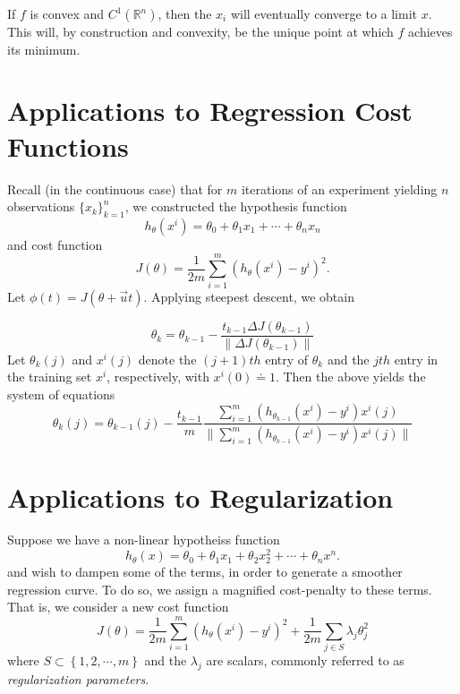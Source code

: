 \documentclass[12pt]{amsbook}
\newcommand{\rr}{\mathbb{R}}
\theoremstyle{plain}
\theoremstyle{definition}
\theoremstyle{remark}
\numberwithin{equation}{section}  %
\numberwithin{equation}{section}  %
\begin{document}
If $f$ is convex and $C^{1}(\rr^{n})$, then the $x_{i}$ will eventually converge
to a limit $x$. This will, by construction and convexity, be the unique point at
which $f$ achieves its minimum.

\section{Applications to Regression Cost Functions}

Recall (in the continuous case) that for $m$ iterations of an experiment
yielding $n$ observations $\{x_{k} \}_{k=1}^{n}$, we constructed the hypothesis function
\begin{equation*}
	h_{\theta}(x^{i}) = \theta_{0} + \theta_{1}x_{1} + \cdots +
	\theta_{n} x_{n}
\end{equation*}
and cost function
\begin{equation*}
	J(\theta) = \frac{1}{2m} \sum_{i=1}^{m} \left (h_{\theta}(x^{i}) - y^{i}
	\right )^{2}.
\end{equation*}
Let $\phi(t) = J(\theta + \vec{u} t)$. Applying steepest descent, we obtain 

\begin{equation*}
	\theta_{k} = \theta_{k-1} - \frac{t_{k-1} \Delta J(\theta_{k-1})}{ \| \Delta
		J(\theta_{k-1}) \|}
\end{equation*}
Let $\theta_{k}(j)$ and $x^{i}(j)$ denote the $(j+1)th$ entry of $\theta_{k}$
and the $jth$ entry in the training set $x^{i}$, respectively, with
$x^{i}(0) \doteq 1$. Then the above yields the system of equations
\begin{equation*}
	\theta_{k}(j) = \theta_{k-1}(j) - \frac{t_{k-1}}{m} \frac{\sum_{i=1}^{m}
	\left( h_{\theta_{k-1}}(x^{i}) - y^{i} \right) x^{i}(j)}{ 
	\|  \sum_{i=1}^{m}
	\left( h_{\theta_{k-1}}(x^{i}) - y^{i} \right) x^{i}(j) \|}
\end{equation*}

\section{Applications to Regularization}
Suppose we have a non-linear hypotheiss function
\begin{equation*}
	h_{\theta}(x) = \theta_{0} + \theta_{1} x_{1} + \theta_{2} x_{2}^{2} + \cdots
	+ \theta_{n} x^{n}.
\end{equation*}
and wish to dampen some of the terms, in order to generate a smoother regression
curve. To do so, we assign a magnified cost-penalty to these terms. That is, we
consider a new cost function
\begin{equation*}
	J(\theta) = \frac{1}{2m} \sum_{i=1}^{m} \left( h_{\theta}(x^{i}) -
	y^{i} \right)^{2} + \frac{1}{2m} \sum_{j \in S} \lambda_{j}
	\theta_{j}^{2}
\end{equation*}
where $S \subset \left\{ 1, 2, \cdots, m \right\}$ and the $\lambda_{j}$ are
scalars, commonly referred to as \emph{regularization parameters}.
\end{document}
